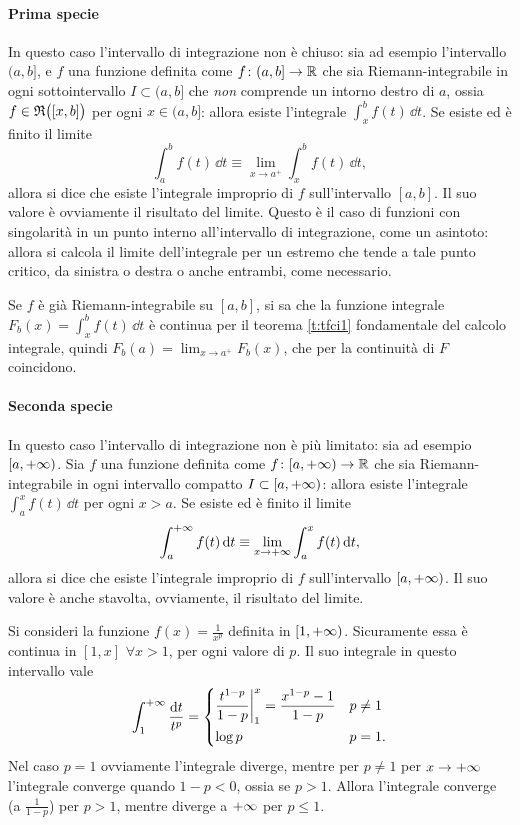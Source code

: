 \paragraph{Prima specie}
In questo caso l'intervallo di integrazione non è chiuso: sia ad esempio l'intervallo $(a,b]$, e $f$ una funzione definita come $f\colon(a,b]\to\mathbb{R}$ che sia Riemann-integrabile in ogni sottointervallo $I\subset(a,b]$ che \emph{non} comprende un intorno destro di $a$, ossia $f\in\mathfrak{R}\big([x,b]\big)$ per ogni $x\in(a,b]$: allora esiste l'integrale $\int_x^bf(t)\,\dd t$.  Se esiste ed è finito il limite
\[
\int_a^bf(t)\,\dd t\equiv\lim_{x\to a^+}\int_x^bf(t)\,\dd t,
\]
allora si dice che esiste l'integrale improprio di $f$ sull'intervallo $[a,b]$. Il suo valore è ovviamente il risultato del limite.
Questo è il caso di funzioni con singolarità in un punto interno all'intervallo di integrazione, come un asintoto: allora si calcola il limite dell'integrale per un estremo che tende a tale punto critico, da sinistra o destra o anche entrambi, come necessario.
\begin{osservazione}
Se $f$ è già Riemann-integrabile su $[a,b]$, si sa che la funzione integrale $F_b(x)=\int_x^bf(t)\,\dd t$ è continua per il teorema \ref{t:tfci1} fondamentale del calcolo integrale, quindi $F_b(a)=\lim_{x\to a^+}F_b(x)$, che per la continuità di $F$ coincidono.
\end{osservazione}
\paragraph{Seconda specie}
In questo caso l'intervallo di integrazione non è più limitato: sia ad esempio $[a,+\infty)$.
Sia $f$ una funzione definita come $f\colon[a,+\infty)\to\mathbb{R}$ che sia Riemann-integrabile in ogni intervallo compatto $I\subset[a,+\infty)$: allora esiste l'integrale $\int_a^xf(t)\,\dd t$ per ogni $x>a$.
Se esiste ed è finito il limite
\[
\int_a^{+\infty} f(t)\,\textup{d} t\equiv\lim_{x\to+\infty}\int_a^xf(t)\,\textup{d} t,
\]
allora si dice che esiste l'integrale improprio di $f$ sull'intervallo $[a,+\infty)$. Il suo valore è anche stavolta, ovviamente, il risultato del limite.

Si consideri la funzione $f(x)=\frac1{x^p}$ definita in $[1,+\infty)$. Sicuramente essa è continua in $[1,x]$ $\forall x>1$, per ogni valore di $p$. Il suo integrale in questo intervallo vale
\[
\int_1^{+\infty}\frac{\textup{d} t}{t^p}=
\begin{dcases}
	\frac{t^{1-p}}{1-p}\bigg|_1^x=\frac{x^{1-p}-1}{1-p}	&p\neq 1\\
	\log p											&p=1.
\end{dcases}
\]
Nel caso $p=1$ ovviamente l'integrale diverge, mentre per $p\neq 1$ per $x\to+\infty$ l'integrale converge quando $1-p<0$, ossia se $p>1$.
Allora l'integrale converge (a $\frac1{1-p}$) per $p>1$, mentre diverge a $+\infty$ per $p\leq 1$.

